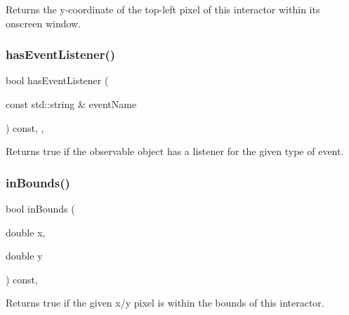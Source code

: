 Returns the y-\/coordinate of the top-\/left pixel of this interactor within its onscreen window. 

\mbox{\label{classGObservable_a9f6faaa25942923bafa1c44020c49fa9}} 
\subsubsection{\texorpdfstring{has\+Event\+Listener()}{hasEventListener()}}
{\footnotesize\ttfamily bool has\+Event\+Listener (\begin{DoxyParamCaption}\item[{const std\+::string \&}]{event\+Name }\end{DoxyParamCaption}) const\hspace{0.3cm}{\ttfamily [protected]}, {\ttfamily [virtual]}, {\ttfamily [inherited]}}



Returns true if the observable object has a listener for the given type of event. 

\mbox{\label{classGInteractor_afc480f652b8c5f1fb255e2269ce68879}} 
\subsubsection{\texorpdfstring{in\+Bounds()}{inBounds()}\hspace{0.1cm}{\footnotesize\ttfamily [1/2]}}
{\footnotesize\ttfamily bool in\+Bounds (\begin{DoxyParamCaption}\item[{double}]{x,  }\item[{double}]{y }\end{DoxyParamCaption}) const\hspace{0.3cm}{\ttfamily [virtual]}, {\ttfamily [inherited]}}



Returns true if the given x/y pixel is within the bounds of this interactor. 

\mbox{\label{classGInteractor_ae6d7982c1c627b677a5e776ca86118ed}} 
